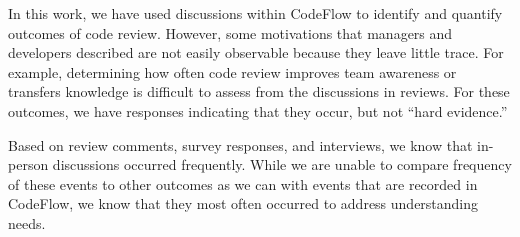 In this work, we have used discussions within CodeFlow to identify and quantify outcomes of code review. However, some motivations that managers and developers described are not easily observable because they leave little trace. For example, determining how often code review improves team awareness or transfers knowledge is difficult to assess from the discussions in reviews. For these outcomes, we have responses indicating that they occur, but not ``hard evidence.''

Based on review comments, survey responses, and interviews, we know that in-person discussions occurred frequently. While we are unable to compare frequency of these events to other outcomes as we can with events that are recorded in CodeFlow, we know that they most often occurred to address understanding needs.

